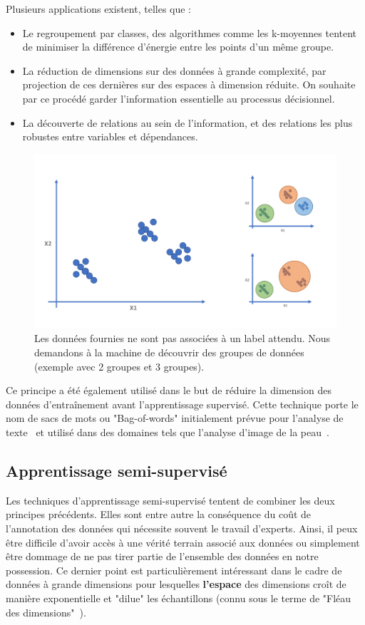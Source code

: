 Plusieurs applications existent, telles que :
\begin{itemize}
	\item Le regroupement par classes, des algorithmes comme les k-moyennes tentent de minimiser la différence d’énergie entre les points d’un même groupe.
	\item La réduction de dimensions sur des données à grande complexité, par projection de ces dernières sur des espaces à dimension réduite. On souhaite par ce procédé garder l’information essentielle au processus décisionnel.
	\item La découverte de relations au sein de l’information, et des relations les plus robustes entre variables et dépendances.
\end{itemize}\par
 
\begin{figure}[H]
    \centering
    \includegraphics[width=0.8\linewidth]{contents/chapter_3/resources/scheme_unsupervised.pdf}
    \caption{Les données fournies ne sont pas associées à un label attendu. Nous demandons à la machine de découvrir des groupes de données (exemple avec 2 groupes et 3 groupes).}
    \label{fig:scheme_unsupervised}
\end{figure}

Ce principe a été également utilisé dans le but de réduire la dimension des données d'entraînement avant l'apprentissage supervisé. Cette technique porte le nom de sacs de mots ou "Bag-of-words" initialement prévue pour l'analyse de texte~\cite{Zhang2010} et utilisé dans des domaines tels que l'analyse d'image de la peau~\cite{Situ2008}.\par

\subsection{Apprentissage semi-supervisé}
Les techniques d'apprentissage semi-supervisé tentent de combiner les deux principes précédents. Elles sont entre autre la conséquence du coût de l'annotation des données qui nécessite souvent le travail d'experts. Ainsi, il peux être difficile d'avoir accès à une vérité terrain associé aux données ou simplement être dommage de ne pas tirer partie de l'ensemble des données en notre possession. Ce dernier point est particulièrement intéressant dans le cadre de données à grande dimensions pour lesquelles \textbf{l'espace} des dimensions croît de manière exponentielle et "dilue" les échantillons (connu sous le terme de "Fléau des dimensions"~\cite{Donoho2000}).\par 

